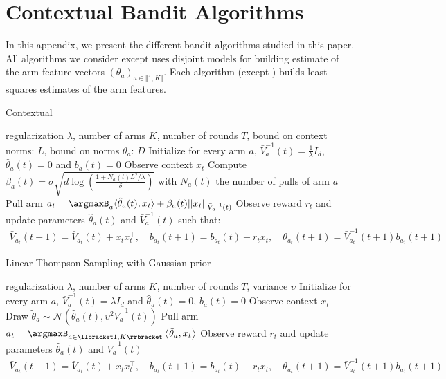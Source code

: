 \section{Contextual Bandit Algorithms}\label{app:algorithms}

In this appendix, we present the different bandit algorithms studied in this paper. All algorithms we consider except \expfour uses disjoint models for building estimate of the arm feature vectors $(\theta_{a})_{a\in\llbracket 1, K\rrbracket}$. Each algorithm (except \expfour) builds least squares estimates of the arm features.

\begin{algorithm}[h]
  \caption{Contextual \linucb}
  \label{alg:linucb}
\begin{algorithmic}
   regularization  $\lambda$, number of arms $K$, number of rounds $T$, bound on context norms: $L$, bound on norms $\theta_{a}$: $D$
  \STATE Initialize for every arm $a$, $\bar{V}_{a}^{-1}(t) = \frac1\lambda I_{d}$, $\hat{\theta}_{a}(t) = 0$ and $b_{a}(t) = 0$
  \STATE Observe context $x_{t}$
  \STATE Compute $\beta_{a}(t) = \sigma\sqrt{d\log\left(\frac{1 +  N_{a}(t)L^{2}/\lambda}{\delta}\right)}$ with $N_{a}(t)$ the number of pulls of arm $a$
  \STATE Pull arm  $a_{t} =\argmaxB_a \langle \hat{\theta}_{a}(t),x_t\rangle + \beta_{a}(t)||x_{t}||_{\bar{V}_{a}^{-1}(t)}$
  \STATE Observe reward $r_{t}$ and update parameters $\hat{\theta}_{a}(t)$ and $\bar{V}_{a}^{-1}(t)$ such that:
  \begin{align*}
      \bar{V}_{a_{t}}(t+1) = \bar{V}_{a_{t}}(t) + x_{t}x_{t}^{\intercal},\quad b_{a_{t}}(t+1) = b_{a_{t}}(t) + r_{t}x_{t},\quad\theta_{a_{t}}(t+1) = \bar{V}_{a_{t}}^{-1}(t+1)b_{a_{t}}(t+1)
  \end{align*}
  \ENDFOR
\end{algorithmic}
\end{algorithm}

\begin{algorithm}[h]
  \caption{Linear Thompson Sampling with Gaussian prior}
  \label{alg:linTS}
\begin{algorithmic}
   regularization  $\lambda$, number of arms $K$, number of rounds $T$, variance $\upsilon$
  \STATE Initialize for every arm $a$, $\bar{V}_{a}^{-1}(t) = \lambda I_{d}$ and $\hat{\theta}_{a}(t) = 0$, $b_{a}(t) = 0$
  \STATE Observe context $x_{t}$
  \STATE Draw $\tilde{\theta}_{a}\sim\mathcal{N}(\hat{\theta}_{a}(t), \upsilon^{2}\bar{V}_{a}^{-1}(t))$
  \STATE Pull arm $a_{t} = \argmaxB_{a\in \llbracket 1, K\rrbracket} \left\langle \tilde{\theta}_{a}, x_{t}\right\rangle$
  \STATE Observe reward $r_{t}$ and update parameters $\hat{\theta}_{a}(t)$ and $\bar{V}_{a}^{-1}(t)$
    \begin{align*}
      \bar{V}_{a_{t}}(t+1) = \bar{V}_{a_{t}}(t) + x_{t}x_{t}^{\intercal},\quad b_{a_{t}}(t+1) = b_{a_{t}}(t) + r_{t}x_{t},\quad\theta_{a_{t}}(t+1) = \bar{V}_{a_{t}}^{-1}(t+1)b_{a_{t}}(t+1)
  \end{align*}
  \ENDFOR
\end{algorithmic}
\end{algorithm}

